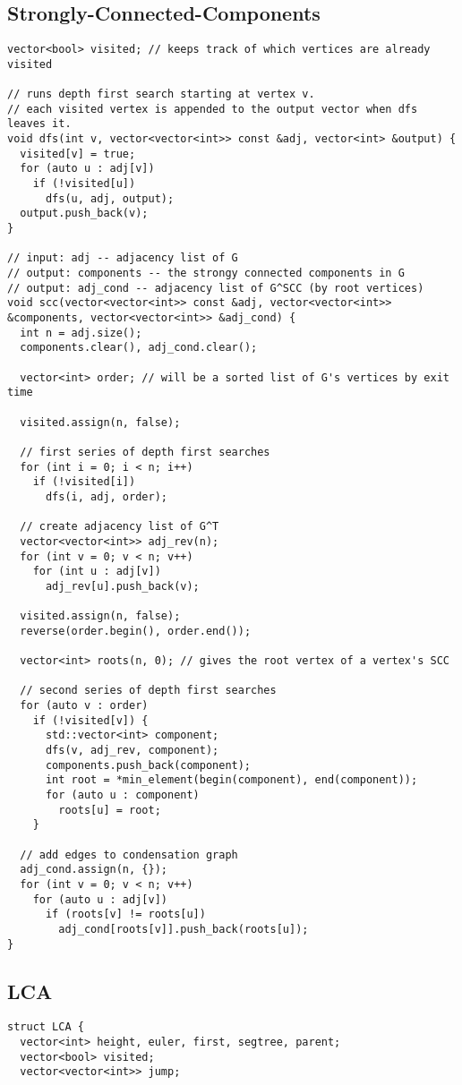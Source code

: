 \documentclass[10pt, a4paper]{article}
\begin{document}
\begin{multicols}{2}
\subsection{Strongly-Connected-Components}
\begin{lstlisting}
vector<bool> visited; // keeps track of which vertices are already visited

// runs depth first search starting at vertex v.
// each visited vertex is appended to the output vector when dfs leaves it.
void dfs(int v, vector<vector<int>> const &adj, vector<int> &output) {
  visited[v] = true;
  for (auto u : adj[v])
    if (!visited[u])
      dfs(u, adj, output);
  output.push_back(v);
}

// input: adj -- adjacency list of G
// output: components -- the strongy connected components in G
// output: adj_cond -- adjacency list of G^SCC (by root vertices)
void scc(vector<vector<int>> const &adj, vector<vector<int>> &components, vector<vector<int>> &adj_cond) {
  int n = adj.size();
  components.clear(), adj_cond.clear();

  vector<int> order; // will be a sorted list of G's vertices by exit time

  visited.assign(n, false);

  // first series of depth first searches
  for (int i = 0; i < n; i++)
    if (!visited[i])
      dfs(i, adj, order);

  // create adjacency list of G^T
  vector<vector<int>> adj_rev(n);
  for (int v = 0; v < n; v++)
    for (int u : adj[v])
      adj_rev[u].push_back(v);

  visited.assign(n, false);
  reverse(order.begin(), order.end());

  vector<int> roots(n, 0); // gives the root vertex of a vertex's SCC

  // second series of depth first searches
  for (auto v : order)
    if (!visited[v]) {
      std::vector<int> component;
      dfs(v, adj_rev, component);
      components.push_back(component);
      int root = *min_element(begin(component), end(component));
      for (auto u : component)
        roots[u] = root;
    }

  // add edges to condensation graph
  adj_cond.assign(n, {});
  for (int v = 0; v < n; v++)
    for (auto u : adj[v])
      if (roots[v] != roots[u])
        adj_cond[roots[v]].push_back(roots[u]);
}
\end{lstlisting}
\subsection{LCA}
\begin{lstlisting}
struct LCA {
  vector<int> height, euler, first, segtree, parent;
  vector<bool> visited;
  vector<vector<int>> jump;


\end{lstlisting}
\end{multicols}
\end{document}
